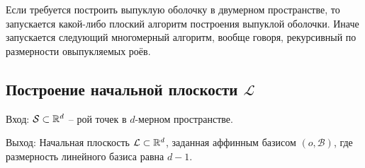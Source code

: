 \documentclass[a4paper,12pt]{article}
\newcommand{\R}[1][]{%
  \ifthenelse{\equal{#1}{}}%
  {\mathbb{R}}%
  {\mathbb{R}^{#1}}}
\newcommand{\Swarm}{\mathcal{S}}              %
\newcommand{\Basis}{\mathcal{B}}              %
\newcommand{\Plane}{\mathcal{L}}           %
\renewcommand{\.}{\hspace{0.2ex}}
\begin{document}
  Если требуется построить выпуклую оболочку в двумерном пространстве, то запускается какой-либо плоский алгоритм построения выпуклой оболочки. Иначе запускается следующий многомерный алгоритм, вообще говоря, рекурсивный по размерности овыпукляемых роёв.

  \subsection{Построение начальной плоскости $\Plane$}
  \label{subsec:InitialPlane}

    Вход: $\Swarm \subset \R[d]$ -- рой точек в $d$-мерном пространстве.

    Выход: Начальная плоскость $\Plane \subset \R[d]$, заданная аффинным базисом $(o,\Basis)$, где размерность линейного базиса равна $d-1$.
\end{document}
